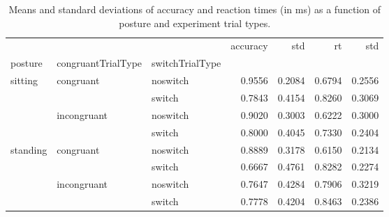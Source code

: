 \begin{table}
\centering
\caption{Means and standard deviations of accuracy and reaction times (in ms) as a function of posture and experiment trial types.}
\label{table-task-switching-replication-reaction-time}
\begin{tabular}{lllrrrr}
\toprule
         &             &        & accuracy &    std &     rt &    std \\
posture & congruantTrialType & switchTrialType &          &        &        &        \\
\midrule
sitting & congruant & noswitch &   0.9556 & 0.2084 & 0.6794 & 0.2556 \\
         &             & switch &   0.7843 & 0.4154 & 0.8260 & 0.3069 \\
         & incongruant & noswitch &   0.9020 & 0.3003 & 0.6222 & 0.3000 \\
         &             & switch &   0.8000 & 0.4045 & 0.7330 & 0.2404 \\
standing & congruant & noswitch &   0.8889 & 0.3178 & 0.6150 & 0.2134 \\
         &             & switch &   0.6667 & 0.4761 & 0.8282 & 0.2274 \\
         & incongruant & noswitch &   0.7647 & 0.4284 & 0.7906 & 0.3219 \\
         &             & switch &   0.7778 & 0.4204 & 0.8463 & 0.2386 \\
\bottomrule
\end{tabular}
\end{table}

